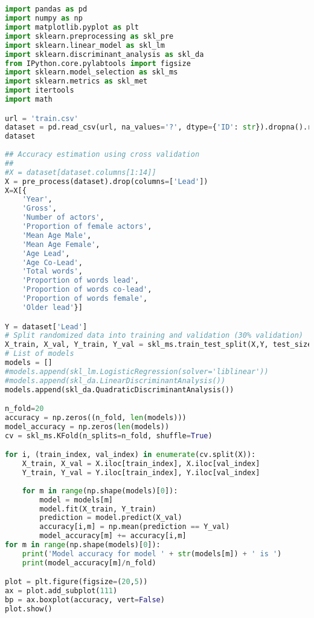 \documentclass[../../project.tex]{subfiles}
\begin{document}
	\begin{lstlisting}[language=Python]


import pandas as pd
import numpy as np
import matplotlib.pyplot as plt
import sklearn.preprocessing as skl_pre
import sklearn.linear_model as skl_lm
import sklearn.discriminant_analysis as skl_da
from IPython.core.pylabtools import figsize
import sklearn.model_selection as skl_ms
import sklearn.metrics as skl_met
import itertools
import math

url = 'train.csv'
dataset = pd.read_csv(url, na_values='?', dtype={'ID': str}).dropna().reset_index()
dataset
    
## Accuracy estimation using cross validation
##
#X = dataset[dataset.columns[1:14]]
X = pre_process(dataset).drop(columns=['Lead'])
X=X[{
    'Year',
    'Gross',
    'Number of actors',
    'Proportion of female actors',
    'Mean Age Male',
    'Mean Age Female',
    'Age Lead',
    'Age Co-Lead',
    'Total words',
    'Proportion of words lead',
    'Proportion of words co-lead',
    'Proportion of words female',
    'Older lead'}]

Y = dataset['Lead']
# Split randomized data into training and validation (30% validation)
X_train, X_val, Y_train, Y_val = skl_ms.train_test_split(X,Y, test_size=0.1)
# List of models
models = []
#models.append(skl_lm.LogisticRegression(solver='liblinear'))
#models.append(skl_da.LinearDiscriminantAnalysis())
models.append(skl_da.QuadraticDiscriminantAnalysis())

n_fold=20
accuracy = np.zeros((n_fold, len(models)))
model_accuracy = np.zeros(len(models))
cv = skl_ms.KFold(n_splits=n_fold, shuffle=True)

for i, (train_index, val_index) in enumerate(cv.split(X)):
    X_train, X_val = X.iloc[train_index], X.iloc[val_index]
    Y_train, Y_val = Y.iloc[train_index], Y.iloc[val_index]
    
    for m in range(np.shape(models)[0]):
        model = models[m]
        model.fit(X_train, Y_train)
        prediction = model.predict(X_val)
        accuracy[i,m] = np.mean(prediction == Y_val)
        model_accuracy[m] += accuracy[i,m]
for m in range(np.shape(models)[0]):
    print('Model accuracy for model ' + str(models[m]) + ' is ')
    print(model_accuracy[m]/n_fold)     

plot = plt.figure(figsize=(20,5))
ax = plot.add_subplot(111)
bp = ax.boxplot(accuracy, vert=False)
plot.show()


\end{lstlisting}
\end{document}
